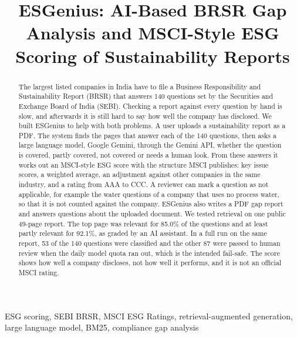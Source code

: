 \documentclass[conference]{IEEEtran}
\begin{document}
\title{ESGenius: AI-Based BRSR Gap Analysis and MSCI-Style ESG Scoring of Sustainability Reports}
\author{ \and {} \and {} \and {}}
\maketitle
\begin{abstract}The largest listed companies in India have to file a Business Responsibility and Sustainability Report (BRSR) that answers 140 questions set by the Securities and Exchange Board of India (SEBI). Checking a report against every question by hand is slow, and afterwards it is still hard to say how well the company has disclosed. We built ESGenius to help with both problems. A user uploads a sustainability report as a PDF. The system finds the pages that answer each of the 140 questions, then asks a large language model, Google Gemini, through the Gemini API, whether the question is covered, partly covered, not covered or needs a human look. From these answers it works out an MSCI-style ESG score with the structure MSCI publishes: key issue scores, a weighted average, an adjustment against other companies in the same industry, and a rating from AAA to CCC. A reviewer can mark a question as not applicable, for example the water questions of a company that uses no process water, so that it is not counted against the company. ESGenius also writes a PDF gap report and answers questions about the uploaded document. We tested retrieval on one public 49-page report. The top page was relevant for 85.0\% of the questions and at least partly relevant for 92.1\%, as graded by an AI assistant. In a full run on the same report, 53 of the 140 questions were classified and the other 87 were passed to human review when the daily model quota ran out, which is the intended fail-safe. The score shows how well a company discloses, not how well it performs, and it is not an official MSCI rating.\end{abstract}
\begin{IEEEkeywords}ESG scoring, SEBI BRSR, MSCI ESG Ratings, retrieval-augmented generation, large language model, BM25, compliance gap analysis\end{IEEEkeywords}
\end{document}

